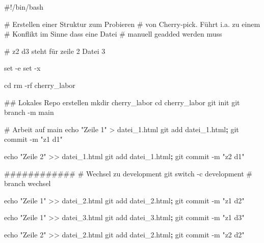 \documentclass[
  ngerman,
  letterpaper,
  DIV=11]{scrreprt}
\newenvironment{Shaded}{\begin{snugshade}}{\end{snugshade}}
\newcommand{\AttributeTok}[1]{\textcolor[rgb]{0.40,0.45,0.13}{#1}}
\newcommand{\BuiltInTok}[1]{\textcolor[rgb]{0.00,0.23,0.31}{#1}}
\newcommand{\CommentTok}[1]{\textcolor[rgb]{0.37,0.37,0.37}{#1}}
\newcommand{\FunctionTok}[1]{\textcolor[rgb]{0.28,0.35,0.67}{#1}}
\newcommand{\KeywordTok}[1]{\textcolor[rgb]{0.00,0.23,0.31}{\textbf{#1}}}
\newcommand{\NormalTok}[1]{\textcolor[rgb]{0.00,0.23,0.31}{#1}}
\newcommand{\OperatorTok}[1]{\textcolor[rgb]{0.37,0.37,0.37}{#1}}
\newcommand{\StringTok}[1]{\textcolor[rgb]{0.13,0.47,0.30}{#1}}
\begin{document}
\begin{Shaded}
\begin{Highlighting}[]
\CommentTok{\#!/bin/bash}

\CommentTok{\# Erstellen einer Struktur zum Probieren }
\CommentTok{\# von Cherry{-}pick. Führt i.a. zu einem }
\CommentTok{\# Konflikt im Sinne dass eine Datei }
\CommentTok{\# manuell geadded werden muss}

\CommentTok{\# z2 d3 steht für zeile 2 Datei 3}

\BuiltInTok{set} \AttributeTok{{-}e}
\BuiltInTok{set} \AttributeTok{{-}x}

\BuiltInTok{cd} 
\FunctionTok{rm} \AttributeTok{{-}rf}\NormalTok{ cherry\_labor}

\CommentTok{\#\# Lokales Repo erstellen}
\FunctionTok{mkdir}\NormalTok{ cherry\_labor}
\BuiltInTok{cd}\NormalTok{ cherry\_labor}
\FunctionTok{git}\NormalTok{ init}
\FunctionTok{git}\NormalTok{ branch }\AttributeTok{{-}m}\NormalTok{ main}

\CommentTok{\# Arbeit auf main}
\BuiltInTok{echo} \StringTok{"Zeile 1"} \OperatorTok{\textgreater{}}\NormalTok{ datei\_1.html}
\FunctionTok{git}\NormalTok{ add datei\_1.html}\KeywordTok{;} \FunctionTok{git}\NormalTok{ commit }\AttributeTok{{-}m} \StringTok{"z1 d1"}

\BuiltInTok{echo} \StringTok{"Zeile 2"} \OperatorTok{\textgreater{}\textgreater{}}\NormalTok{ datei\_1.html}
\FunctionTok{git}\NormalTok{ add datei\_1.html}\KeywordTok{;} \FunctionTok{git}\NormalTok{ commit }\AttributeTok{{-}m} \StringTok{"z2 d1"}

\CommentTok{\#\#\#\#\#\#\#\#\#\#\#\#}
\CommentTok{\# Wechsel zu development }
\FunctionTok{git}\NormalTok{ switch }\AttributeTok{{-}c}\NormalTok{ development  }\CommentTok{\# branch wechsel}

\BuiltInTok{echo} \StringTok{"Zeile 1"} \OperatorTok{\textgreater{}\textgreater{}}\NormalTok{ datei\_2.html}
\FunctionTok{git}\NormalTok{ add datei\_2.html}\KeywordTok{;} \FunctionTok{git}\NormalTok{ commit }\AttributeTok{{-}m} \StringTok{"z1 d2"}

\BuiltInTok{echo} \StringTok{"Zeile 1"} \OperatorTok{\textgreater{}\textgreater{}}\NormalTok{ datei\_3.html}
\FunctionTok{git}\NormalTok{ add datei\_3.html}\KeywordTok{;} \FunctionTok{git}\NormalTok{ commit }\AttributeTok{{-}m} \StringTok{"z1 d3"}

\BuiltInTok{echo} \StringTok{"Zeile 2"} \OperatorTok{\textgreater{}\textgreater{}}\NormalTok{ datei\_2.html}
\FunctionTok{git}\NormalTok{ add datei\_2.html}\KeywordTok{;} \FunctionTok{git}\NormalTok{ commit }\AttributeTok{{-}m} \StringTok{"z2 d2"}


\end{Highlighting}
\end{Shaded}
\end{document}

